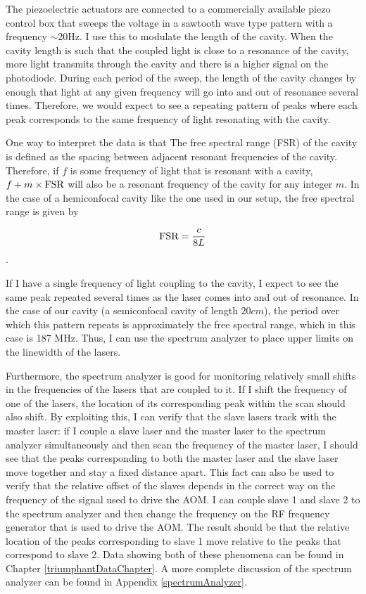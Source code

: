 The piezoelectric actuators are connected to a commercially available piezo control box that sweeps the voltage in a sawtooth wave type pattern with a frequency $\sim$20Hz. I use this to modulate the length of the cavity. When the cavity length is such that the coupled light is close to a resonance of the cavity, more light transmits through the cavity and there is a higher signal on the photodiode. During each period of the sweep, the length of the cavity changes by enough that light at any given frequency will go into and out of resonance several times. Therefore, we would expect to see a repeating pattern of peaks where each peak corresponds to the same frequency of light resonating with the cavity. 


One way to interpret the data is that The free spectral range (FSR) of the cavity is defined as the spacing between adjacent resonant frequencies of the cavity. Therefore, if $f$ is some frequency of light that is resonant with a cavity, $f+m\times \textnormal{FSR}$ will also be a resonant frequency of the cavity for any integer $m$. In the case of a hemiconfocal cavity like the one used in our setup, the free spectral range is given by 

\begin{equation}
    \textnormal{FSR}=\frac{c}{8L}
\end{equation}.

If I have a single frequency of light coupling to the cavity, I expect to see the same peak repeated several times as the laser comes into and out of resonance. In the case of our cavity (a semiconfocal cavity of length $20cm$), the period over which this pattern repeats is approximately the free spectral range, which in this case is 187 MHz. Thus, I can use the spectrum analyzer to place upper limits on the linewidth of the lasers. 

Furthermore, the spectrum analyzer is good for monitoring relatively small shifts in the frequencies of the lasers that are coupled to it. If I shift the frequency of one of the lasers, the location of its corresponding peak within the scan should also shift. 
By exploiting this, I can verify that the slave lasers track with the master laser: if I couple a slave laser and the master laser to the spectrum analyzer simultaneously and then scan the frequency of the master laser, I should see that the peaks corresponding to both the master laser and the slave laser move together and stay a fixed distance apart. 
This fact can also be used to verify that the relative offset of the slaves depends in the correct way on the frequency of the signal used to drive the AOM. I can couple slave 1 and slave 2 to the spectrum analyzer and then change the frequency on the RF frequency generator that is used to drive the AOM. The result should be that the relative location of the peaks corresponding to slave 1 move relative to the peaks that correspond to slave 2. Data showing both of these phenomena can be found in Chapter \ref{triumphantDataChapter}. A more complete discussion of the spectrum analyzer can be found in Appendix \ref{spectrumAnalyzer}. 
